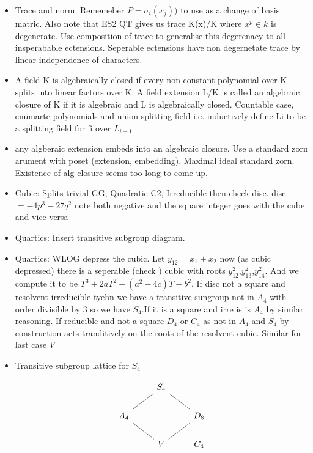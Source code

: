 \documentclass{article}
\begin{document}
\begin{itemize}
        \item  Trace and norm. Rememeber $P= \sigma_i(x_j))$ to use as a change of basis matric. Also note that ES2 QT gives us trace K(x)/K where $x^p \in k$ is degenerate. Use composition of trace to generalise this degerenacy to all insperabable ectensions. Seperable ectensions have non degernetate trace 
        by linear independence of characters.
        \item A field K is algebraically closed if every non-constant polynomial over K splits into linear factors over K. A field extension L/K is called an algebraic closure of K if it is algebraic and L is algebraically closed. Countable case, enumarte polynomials and union splitting field i.e. inductively define Li to be a splitting field for fi over $L_{i-1}$
        \item any algberaic extension embeds into an algebraic closure. Use a standard zorn arument with poset (extension, embedding). Maximal ideal standard zorn. Existence of alg closure seems too long to come up.
        \item Cubic: Splits trivial GG, Quadratic C2, Irreducible then check disc. disc $= -4p^3-27q^2$ note both negative and the square integer goes with the cube and vice versa
        \item Quartics: Insert transitive subgroup diagram.
        \item Quartics: WLOG depress the cubic. Let $y_{12}=x_1+x_2$ now (as cubic depressed) there is a seperable (check ) cubic with roots $y_{12}^2$,$y_{13}^2$,$y_{14}^2$. And we compute it to be $T^3 +2aT^2 + (a^2 -4c)T - b^2$. If disc not a square and resolvent irreducible tyehn we have a transitive sungroup not in $A_4$ with order divisible by $3$ so we have $S_4$.If it is a square and irre is is $A_4$ by similar reasoning. If reducible and not a square $D_4 $ or $C_4$ as not in $A_4$ and $S_4$ by construction acts tranditively on the roots of the resolvent cubic. Similar for last case $V$
        \item Transitive subgroup lattice for $S_4$\begin{center}\[ \begin{tikzcd}
	& {S_4} \\
	{A_4} && {D_8} \\
	& V & {C_4}
	\arrow[no head, from=3-2, to=2-1]
	\arrow[no head, from=3-2, to=2-3]
	\arrow[no head, from=1-2, to=2-1]
	\arrow[no head, from=1-2, to=2-3]
	\arrow[no head, from=2-3, to=3-3]
\end{tikzcd}\]
\end{center}

\end{itemize}
\end{document}
